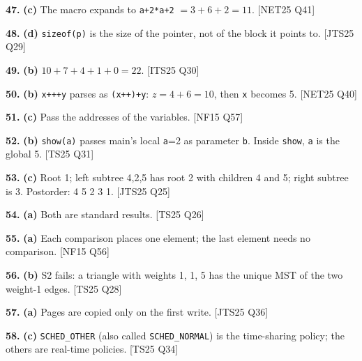 \documentclass[11pt,a4paper]{article}
\begin{document}
\noindent\textbf{47.} \textbf{(c)} The macro expands to \texttt{a+2*a+2} $=3+6+2=11$. {\color{ember}\scriptsize[NET25 Q41]}\par\vspace{3pt}
\noindent\textbf{48.} \textbf{(d)} \texttt{sizeof(p)} is the size of the pointer, not of the block it points to. {\color{ember}\scriptsize[JTS25 Q29]}\par\vspace{3pt}
\noindent\textbf{49.} \textbf{(b)} $10+7+4+1+0=22$. {\color{ember}\scriptsize[ITS25 Q30]}\par\vspace{3pt}
\noindent\textbf{50.} \textbf{(b)} \texttt{x+++y} parses as \texttt{(x++)+y}: $z=4+6=10$, then \texttt{x} becomes 5. {\color{ember}\scriptsize[NET25 Q40]}\par\vspace{3pt}
\noindent\textbf{51.} \textbf{(c)} Pass the addresses of the variables. {\color{ember}\scriptsize[NF15 Q57]}\par\vspace{3pt}
\noindent\textbf{52.} \textbf{(b)} \texttt{show(a)} passes main's local \texttt{a}=2 as parameter \texttt{b}. Inside \texttt{show}, \texttt{a} is the global 5. {\color{ember}\scriptsize[TS25 Q31]}\par\vspace{3pt}
\noindent\textbf{53.} \textbf{(c)} Root 1; left subtree {4,2,5} has root 2 with children 4 and 5; right subtree is {3}. Postorder: 4 5 2 3 1. {\color{ember}\scriptsize[JTS25 Q25]}\par\vspace{3pt}
\noindent\textbf{54.} \textbf{(a)} Both are standard results. {\color{ember}\scriptsize[TS25 Q26]}\par\vspace{3pt}
\noindent\textbf{55.} \textbf{(a)} Each comparison places one element; the last element needs no comparison. {\color{ember}\scriptsize[NF15 Q56]}\par\vspace{3pt}
\noindent\textbf{56.} \textbf{(b)} S2 fails: a triangle with weights 1, 1, 5 has the unique MST of the two weight-1 edges. {\color{ember}\scriptsize[TS25 Q28]}\par\vspace{3pt}
\noindent\textbf{57.} \textbf{(a)} Pages are copied only on the first write. {\color{ember}\scriptsize[JTS25 Q36]}\par\vspace{3pt}
\noindent\textbf{58.} \textbf{(c)} \texttt{SCHED\_OTHER} (also called \texttt{SCHED\_NORMAL}) is the time-sharing policy; the others are real-time policies. {\color{ember}\scriptsize[TS25 Q34]}\par\vspace{3pt}
\end{document}
